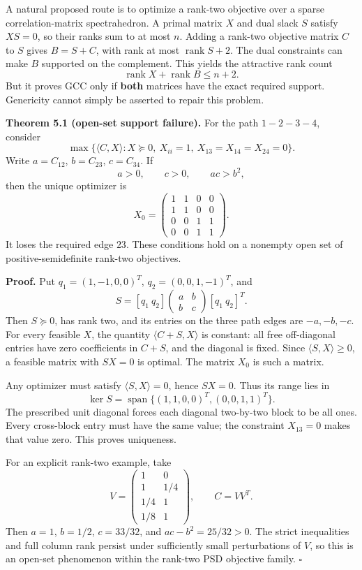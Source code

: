 \documentclass[
  10pt,
]{article}
\begin{document}
A natural proposed route is to optimize a rank-two objective over a
sparse correlation-matrix spectrahedron. A primal matrix \(X\) and dual
slack \(S\) satisfy \(XS=0\), so their ranks sum to at most \(n\).
Adding a rank-two objective matrix \(C\) to \(S\) gives \(B=S+C\), with
rank at most \(\operatorname{rank}S+2\). The dual constraints can make
\(B\) supported on the complement. This yields the attractive rank count
\[
 \operatorname{rank}X+\operatorname{rank}B\le n+2.
\] But it proves GCC only if \textbf{both} matrices have the exact
required support. Genericity cannot simply be asserted to repair this
problem.

\textbf{Theorem 5.1 (open-set support failure).} For the path
\(1-2-3-4\), consider \[
 \max\{\langle C,X\rangle:X\succeq0,\ X_{ii}=1,\ X_{13}=X_{14}=X_{24}=0\}.
\] Write \(a=C_{12}\), \(b=C_{23}\), \(c=C_{34}\). If \[
 a>0,\qquad c>0,\qquad ac>b^2,
\] then the unique optimizer is \[
 X_0=\begin{pmatrix}1&1&0&0\\1&1&0&0\\0&0&1&1\\0&0&1&1\end{pmatrix}.
\] It loses the required edge \(23\). These conditions hold on a
nonempty open set of positive-semidefinite rank-two objectives.

\textbf{Proof.} Put \(q_1=(1,-1,0,0)^T\), \(q_2=(0,0,1,-1)^T\), and \[
 S=[q_1\ q_2]\begin{pmatrix}a&b\\b&c\end{pmatrix}[q_1\ q_2]^T.
\] Then \(S\succeq0\), has rank two, and its entries on the three path
edges are \(-a,-b,-c\). For every feasible \(X\), the quantity
\(\langle C+S,X\rangle\) is constant: all free off-diagonal entries have
zero coefficients in \(C+S\), and the diagonal is fixed. Since
\(\langle S,X\rangle\ge0\), a feasible matrix with \(SX=0\) is optimal.
The matrix \(X_0\) is such a matrix.

Any optimizer must satisfy \(\langle S,X\rangle=0\), hence \(SX=0\).
Thus its range lies in \[
 \ker S=\operatorname{span}\{(1,1,0,0)^T,(0,0,1,1)^T\}.
\] The prescribed unit diagonal forces each diagonal two-by-two block to
be all ones. Every cross-block entry must have the same value; the
constraint \(X_{13}=0\) makes that value zero. This proves uniqueness.

For an explicit rank-two example, take \[
 V=\begin{pmatrix}1&0\\1&1/4\\1/4&1\\1/8&1\end{pmatrix},\qquad C=VV^T.
\] Then \(a=1\), \(b=1/2\), \(c=33/32\), and \(ac-b^2=25/32>0\). The
strict inequalities and full column rank persist under sufficiently
small perturbations of \(V\), so this is an open-set phenomenon within
the rank-two PSD objective family. \(\square\)
\end{document}
